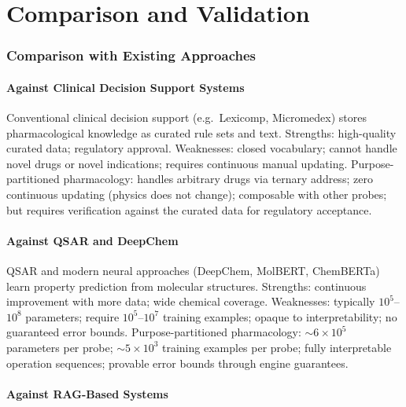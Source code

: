 \documentclass[11pt,twocolumn,a4paper]{article}
\theoremstyle{definition}
\theoremstyle{remark}
\begin{document}
\part{Comparison and Validation}

\section{Comparison with Existing Approaches}
\label{sec:comparison}

\subsection{Against Clinical Decision Support Systems}

Conventional clinical decision support (e.g.\ Lexicomp, Micromedex) stores pharmacological knowledge as curated rule sets and text. Strengths: high-quality curated data; regulatory approval. Weaknesses: closed vocabulary; cannot handle novel drugs or novel indications; requires continuous manual updating. Purpose-partitioned pharmacology: handles arbitrary drugs via ternary address; zero continuous updating (physics does not change); composable with other probes; but requires verification against the curated data for regulatory acceptance.

\subsection{Against QSAR and DeepChem}

QSAR and modern neural approaches (DeepChem, MolBERT, ChemBERTa) learn property prediction from molecular structures. Strengths: continuous improvement with more data; wide chemical coverage. Weaknesses: typically $10^5$--$10^8$ parameters; require $10^5$--$10^7$ training examples; opaque to interpretability; no guaranteed error bounds. Purpose-partitioned pharmacology: $\sim\!6 \times 10^5$ parameters per probe; $\sim\!5 \times 10^3$ training examples per probe; fully interpretable operation sequences; provable error bounds through engine guarantees.

\subsection{Against RAG-Based Systems}
\end{document}
